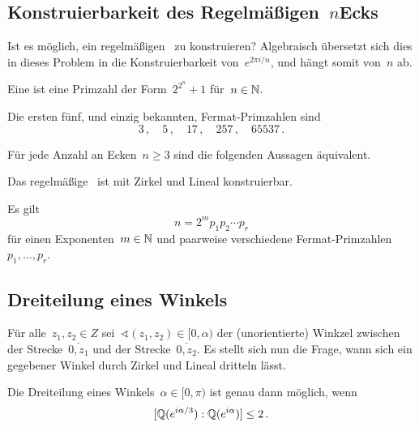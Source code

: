 \subsection{Konstruierbarkeit des Regelmäßigen~\texorpdfstring{$n$}-Ecks}

Ist es möglich, ein regelmäßigen~ zu konstruieren?
Algebraisch übersetzt sich dies in dieses Problem in die Konstruierbarkeit von~$e^{2 \pi i / n}$, und hängt somit von~$n$ ab.

\begin{definition}
  Eine  ist eine Primzahl der Form~$2^{2^n} + 1$ für~$n \in \mathbb{N}$.
\end{definition}

\begin{example}
  Die ersten fünf, und einzig bekannten, Fermat-Primzahlen sind
  \[
    3 \,,
    \quad
    5 \,,
    \quad
    17 \,,
    \quad
    257 \,,
    \quad
    65537 \,.
  \]
\end{example}

\begin{theorem}[Gauß]
  Für jede Anzahl an Ecken~$n \geq 3$ sind die folgenden Aussagen äquivalent.
  \begin{equivlist}
    \item
      Das regelmäßige~ ist mit Zirkel und Lineal konstruierbar.
    \item
      Es gilt
      \[
        n = 2^m p_1 p_2 \dotsm p_r
      \]
      für einen Exponenten~$m \in \mathbb{N}$ und paarweise verschiedene Fermat-Primzahlen~$p_1, \dotsc, p_r$.
  \end{equivlist}
\end{theorem}



\subsection{Dreiteilung eines Winkels}

Für alle~$z_1, z_2 \in Z$ sei~$\sphericalangle(z_1, z_2) \in [0, \alpha)$ der (unorientierte) Winkzel zwischen der Strecke~$\overline{0,z_1}$ und der Strecke~$\overline{0,z_2}$.
Es stellt sich nun die Frage, wann sich ein gegebener Winkel durch Zirkel und Lineal dritteln lässt.

\begin{proposition}
  Die Dreiteilung eines Winkels~$\alpha \in [0, \pi)$ ist genau dann möglich, wenn
  \[
    [ \mathbb{Q}( e^{i \alpha / 3}  ) : \mathbb{Q}( e^{i \alpha} ) ]
    \leq 2
    \,.
  \]
\end{proposition}





